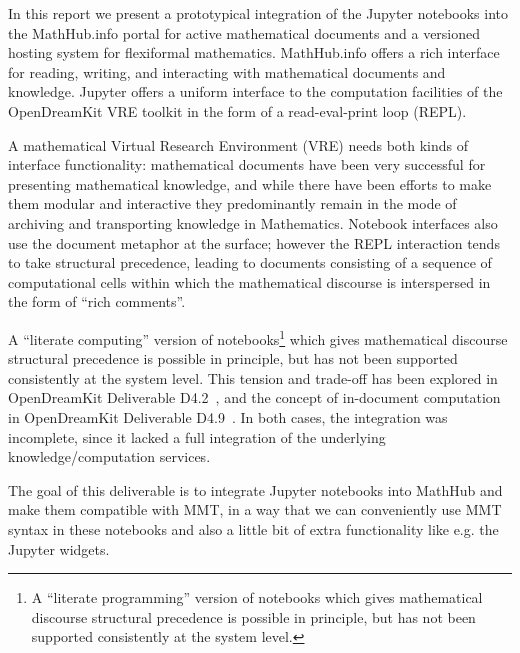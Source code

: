In this report we present a prototypical integration of the Jupyter notebooks into the MathHub.info portal for active mathematical documents and a versioned hosting system for flexiformal mathematics.
MathHub.info offers a rich interface for reading, writing, and interacting with mathematical documents and knowledge. Jupyter offers a uniform interface to the computation facilities of the OpenDreamKit VRE toolkit in the form of a read-eval-print loop (REPL).

A mathematical Virtual Research Environment (VRE) needs both kinds of interface functionality: mathematical documents have been very successful for presenting mathematical knowledge, and while there have been efforts to make them modular and interactive they predominantly remain in the mode of archiving and transporting knowledge in Mathematics.
Notebook interfaces also use the document metaphor at the surface; however the REPL interaction
tends to take structural precedence, leading to documents consisting of a sequence of computational cells within which the mathematical discourse is interspersed in the form of ``rich comments''.

A ``literate computing'' version of notebooks\footnote {A ``literate programming'' version of notebooks which gives mathematical discourse structural precedence is possible in principle, but has not been supported consistently at the system level.} which gives mathematical discourse structural precedence is possible in principle, but has not been supported consistently at the system level.
This tension and trade-off has been explored in OpenDreamKit Deliverable D4.2~\cite{ODK-D4.2}, and the concept of in-document computation in OpenDreamKit Deliverable D4.9~\cite{ODK-D4.9}.
In both cases, the integration was incomplete, since it lacked a full integration of the
underlying knowledge/computation services.

The goal of this deliverable is to integrate Jupyter notebooks into MathHub and make them compatible with MMT, in a way that we can conveniently use MMT syntax in these notebooks and also a little bit of extra functionality like e.g. the Jupyter widgets.

